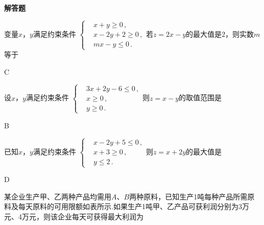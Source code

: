 \begin{exercise}{\bf 解答题}
\begin{exercise}
      变量$x$，$y$满足约束条件
      $\left\{\begin{aligned}
        &x+y\geqslant0\,,\\
        &x-2y+2\geqslant0\,,\\
        &mx-y\leqslant0\,.
      \end{aligned}\right.$若$z=2x-y$的最大值是$2$，则实数$m$等于\xz
      \begin{answer}
        C
      \end{answer}
    \item %
      设$x$，$y$满足约束条件
      $\left\{\begin{aligned}
        &3x+2y-6\leqslant0\,,\\
        &x\geqslant0\,,\\
        &y\geqslant0\,.
      \end{aligned}\right.$则$z=x-y$的取值范围是\xz
      \xx{$[-3,0]$}{$[-3,2]$}{$[0,2]$}{$[0,3]$}
      \begin{answer}
        B
      \end{answer}
    \item %
      已知$x$，$y$满足约束条件
      $\left\{\begin{aligned}
        &x-2y+5\leqslant0\,,\\
        &x+3\geqslant0\,,\\
        &y\leqslant2\,.
      \end{aligned}\right.$则$z=x+2y$的最大值是\xz
      \begin{answer}
        D
      \end{answer}
    \item %
      某企业生产甲、乙两种产品均需用$A$、$B$两种原料，已知生产1吨每种产品所需原料及每天原料的可用限额如表所示.如果生产1吨甲、乙产品可获利润分别为3万元、4万元，则该企业每天可获得最大利润为\xz
      \begin{center}\begin{tabular}{|*{4}{c|}}
          \hline


\end{tabular}
\end{center}
\end{exercise}
\end{exercise}
